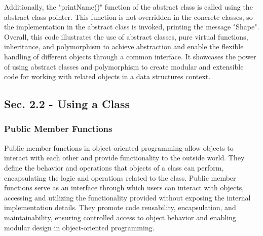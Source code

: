 \begin{solution}
    \noindent Additionally, the "printName()" function of the abstract class is called using the abstract class pointer. This function is not overridden in the concrete classes, so the implementation in the abstract class is invoked, printing the message 
    "Shape". \\

    \noindent Overall, this code illustrates the use of abstract classes, pure virtual functions, inheritance, and polymorphism to achieve abstraction and enable the flexible handling of different objects through a common interface. It showcases the power 
    of using abstract classes and polymorphism to create modular and extensible code for working with related objects in a data structures context. \\
\end{solution}

\subsection*{Sec. 2.2 - Using a Class}
\subsubsection*{Public Member Functions}

Public member functions in object-oriented programming allow objects to interact with each other and provide functionality to the outside world. They define the behavior and operations that objects of a class can perform, encapsulating the logic and operations
related to the class. Public member functions serve as an interface through which users can interact with objects, accessing and utilizing the functionality provided without exposing the internal implementation details. They promote code reusability, encapsulation, 
and maintainability, ensuring controlled access to object behavior and enabling modular design in object-oriented programming. \\

